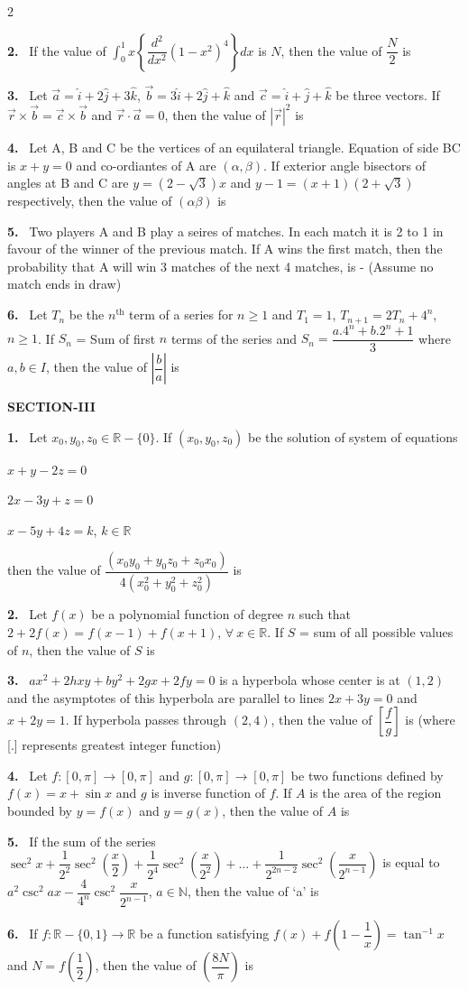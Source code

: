 \documentclass[10pt]{extarticle}
\newcommand{\sect}[1]{\par\smallskip\noindent\textbf{#1}\par}
\newcommand{\qn}[1]{\par\smallskip\noindent\textbf{#1.}~}
\begin{document}
\begin{multicols}{2}
\qn{2} If the value of $\displaystyle\int_0^1x\left\{\dfrac{d^2}{dx^2}\left(1-x^2\right)^4\right\}dx$ is $N$, then the value of $\dfrac N2$ is

\qn{3} Let $\vec a=\hat i+2\hat j+3\hat k$, $\vec b=3\hat i+2\hat j+\hat k$ and $\vec c=\hat i+\hat j+\hat k$ be three vectors. If $\vec r\times\vec b=\vec c\times\vec b$ and $\vec r\cdot\vec a=0$, then the value of $|\vec r|^2$ is

\qn{4} Let A, B and C be the vertices of an equilateral triangle. Equation of side BC is $x+y=0$ and co-ordiantes of A are $(\alpha,\beta)$. If exterior angle bisectors of angles at B and C are $y=\left(2-\sqrt3\right)x$ and $y-1=(x+1)\left(2+\sqrt3\right)$ respectively, then the value of $(\alpha\beta)$ is

\qn{5} Two players A and B play a seires of matches. In each match it is 2 to 1 in favour of the winner of the previous match. If A wins the first match, then the probability that A will win 3 matches of the next 4 matches, is - (Assume no match ends in draw)

\qn{6} Let $T_n$ be the $n^{\text{th}}$ term of a series for $n\ge1$ and $T_1=1$, $T_{n+1}=2T_n+4^n$, $n\ge1$. If $S_n$ = Sum of first $n$ terms of the series and $S_n=\dfrac{a.4^n+b.2^n+1}{3}$ where $a,b\in I$, then the value of $\left|\dfrac ba\right|$ is

\sect{SECTION-III}
\qn{1} Let $x_0,y_0,z_0\in\mathbb R-\{0\}$. If $(x_0,y_0,z_0)$ be the solution of system of equations

$x+y-2z=0$

$2x-3y+z=0$

$x-5y+4z=k$, $k\in\mathbb R$

then the value of $\dfrac{(x_0y_0+y_0z_0+z_0x_0)}{4\left(x_0^2+y_0^2+z_0^2\right)}$ is

\qn{2} Let $f(x)$ be a polynomial function of degree $n$ such that $2+2f(x)=f(x-1)+f(x+1)$, $\forall\ x\in\mathbb R$. If $S$ = sum of all possible values of $n$, then the value of $S$ is

\qn{3} $ax^2+2hxy+by^2+2gx+2fy=0$ is a hyperbola whose center is at $(1,2)$ and the asymptotes of this hyperbola are parallel to lines $2x+3y=0$ and $x+2y=1$. If hyperbola passes through $(2,4)$, then the value of $\left[\dfrac fg\right]$ is (where [.] represents greatest integer function)

\qn{4} Let $f:[0,\pi]\to[0,\pi]$ and $g:[0,\pi]\to[0,\pi]$ be two functions defined by $f(x)=x+\sin x$ and $g$ is inverse function of $f$. If $A$ is the area of the region bounded by $y=f(x)$ and $y=g(x)$, then the value of $A$ is

\qn{5} If the sum of the series $\sec^2x+\dfrac{1}{2^2}\sec^2\left(\dfrac x2\right)+\dfrac{1}{2^4}\sec^2\left(\dfrac x{2^2}\right)+\ldots+\dfrac{1}{2^{2n-2}}\sec^2\left(\dfrac{x}{2^{n-1}}\right)$ is equal to $a^2\csc^2ax-\dfrac{4}{4^n}\csc^2\dfrac{x}{2^{n-1}}$, $a\in\mathbb N$, then the value of `a' is

\qn{6} If $f:\mathbb R-\{0,1\}\to\mathbb R$ be a function satisfying $f(x)+f\left(1-\dfrac1x\right)=\tan^{-1}x$ and $N=f\left(\dfrac12\right)$, then the value of $\left(\dfrac{8N}{\pi}\right)$ is
\end{multicols}
\end{document}

